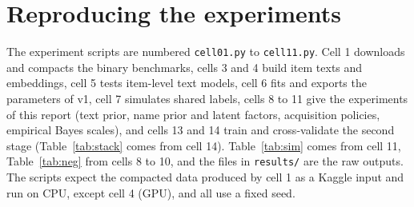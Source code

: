 \documentclass{article}
\begin{document}
\section{Reproducing the experiments}
\label{app:rep}
The experiment scripts are numbered \texttt{cell01.py} to \texttt{cell11.py}. Cell 1 downloads and compacts the binary benchmarks, cells 3 and 4 build item texts and embeddings, cell 5 tests item-level text models, cell 6 fits and exports the parameters of v1, cell 7 simulates shared labels, cells 8 to 11 give the experiments of this report (text prior, name prior and latent factors, acquisition policies, empirical Bayes scales), and cells 13 and 14 train and cross-validate the second stage (Table~\ref{tab:stack} comes from cell 14). Table~\ref{tab:sim} comes from cell 11, Table~\ref{tab:neg} from cells 8 to 10, and the files in \texttt{results/} are the raw outputs. The scripts expect the compacted data produced by cell 1 as a Kaggle input and run on CPU, except cell 4 (GPU), and all use a fixed seed.
\end{document}
